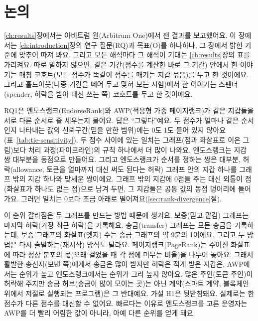 \chapter{논의}
\label{ch:discussion}

\ref{ch:results}장에서는 아비트럼 원(Arbitrum One)에서 잰 결과를 보고했어요. 이 장에서는 \ref{ch:introduction}장의 연구 질문(RQ)과 목표(O)를 하나하나, 그 장에서 밝힌 기준에 맞추어 따져 봐요. 그리고 모든 해석마다 그 해석이 기대는 \ref{ch:results}장의 표를 가리켜요. 따로 말하지 않으면, 같은 기간(점수를 계산한 바로 그 기간) 안에서 한 이야기는 매칭 코호트(모든 점수가 똑같이 점수를 매기는 지갑 묶음)를 두고 한 것이에요. 그리고 홀드아웃(나중 기간을 떼어 두고 맞혀 보는 시험)에서 한 이야기는 스펜더(spender, 허락을 받아 대신 쓰는 쪽) 코호트를 두고 한 것이에요.



RQ1은 엔도스랭크(EndorseRank)와 AWP(적응형 가중 페이지랭크)가 같은 지갑들을 서로 다른 순서로 줄 세우는지 물어요. 답은 “그렇다”예요. 두 점수가 얼마나 같은 순서인지 나타내는 값의 신뢰구간(믿을 만한 범위)에는 0도 1도 들어 있지 않아요(표~\ref{tab:tie-sensitivity}). 두 점수 사이에 있는 일치는 그래프(점과 화살표로 이은 그림)보다 처리 과정(파이프라인)의 규칙 하나에서 더 많이 나와요. 엔도스랭크는 지갑 쌍 대부분을 동점으로 만들어요. 그리고 엔도스랭크가 순서를 정하는 쌍은 대부분, 허락(allowance, 토큰을 얼마까지 대신 써도 된다는 허락) 그래프 안의 지갑 하나를 그래프 밖의 지갑 하나와 맞세운 쌍이에요. 그래프 밖의 지갑에 0점을 주는 대신 외톨이 점(화살표가 하나도 없는 점)으로 남겨 두면, 그 지갑들은 공통 값의 동점 덩어리에 들어가요. 그러면 일치는 0보다 조금 아래로 떨어져요(\ref{sec:rank-divergence}절).

이 순위 갈라짐은 두 그래프를 만드는 방법 때문에 생겨요. 보증(믿고 맡김) 그래프는 마지막 허락(가장 최근 허락)을 기록해요. 송금(transfer) 그래프는 모든 송금을 기록하는데, 보증 그래프의 화살표(엣지) 수는 송금 그래프의 약 9분의 1이에요. 그리고 두 방법은 다시 출발하는(재시작) 방식도 달라요. 페이지랭크(PageRank)는 주어진 화살표에 따라 정상 분포의 몫(오래 걸었을 때 각 점에 머무는 비율)을 나누어 놓아요. 그래서 활발한 송신자(보낸 쪽)에게서 송금은 많이 받지만 허락은 적게 받은 지갑은, AWP에서는 순위가 높고 엔도스랭크에서는 순위가 그리 높지 않아요. 많은 주인(토큰 주인)이 허락해 주지만 송금 허브(송금이 많이 모이는 곳)는 아닌 계약(스마트 계약, 블록체인 위에서 저절로 실행되는 프로그램)은 그 반대예요. 가설 H1은 뒷받침돼요. 실제로는 한 점수가 다른 점수를 대신할 수 없어요. 빠르다는 이유로 엔도스랭크를 고른 운영자는 AWP를 더 빨리 어림한 값이 아니라, 아예 다른 순위를 얻게 돼요.

